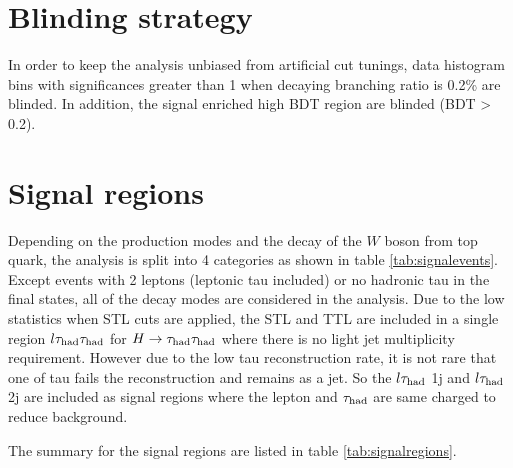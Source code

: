 \section{Blinding strategy}
\label{sec:blind}

In order to keep the analysis unbiased from artificial cut tunings, data histogram bins with significances greater than 1 when decaying branching ratio is 0.2\% are blinded. In addition, the signal enriched high BDT region are blinded (BDT > 0.2).

\section{Signal regions}
\label{sec:SRs}
Depending on the production modes and the decay of the $W$ boson from top quark, the analysis is split into 4 categories as shown in table \ref{tab:signalevents}. Except events with 2 leptons (leptonic tau included) or no hadronic tau in the final states, all of the decay modes are considered in the analysis.
Due to the low statistics when STL cuts are applied, the STL and TTL are included in a single region $l\tau_\text{had}{}\tau_\text{had}$ for $H\to\tau_\text{had}{}\tau_\text{had}$ where there is no light jet multiplicity requirement. However due to the low tau reconstruction rate, it is not rare that one of tau fails the reconstruction and remains as a jet. So the $l\tau_\text{had}$ 1j and $l\tau_\text{had}$ 2j are included as signal regions where the lepton and $\tau_\text{had}$ are same charged to reduce background.

The summary for the signal regions are listed in table \ref{tab:signalregions}.

